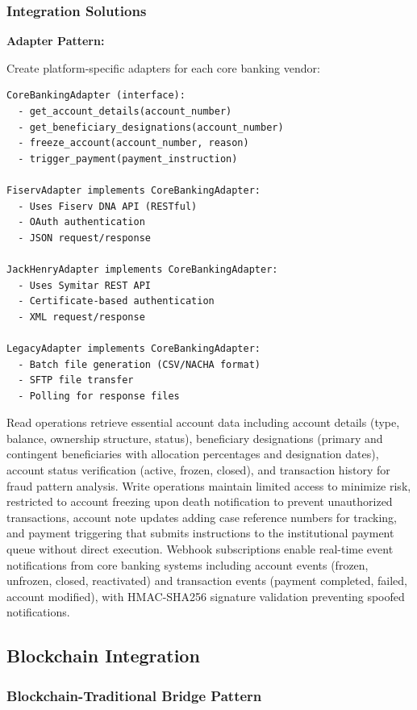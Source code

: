 \subsubsection{Integration Solutions}

\textbf{Adapter Pattern:}

Create platform-specific adapters for each core banking vendor:

\begin{verbatim}
CoreBankingAdapter (interface):
  - get_account_details(account_number)
  - get_beneficiary_designations(account_number)
  - freeze_account(account_number, reason)
  - trigger_payment(payment_instruction)

FiservAdapter implements CoreBankingAdapter:
  - Uses Fiserv DNA API (RESTful)
  - OAuth authentication
  - JSON request/response

JackHenryAdapter implements CoreBankingAdapter:
  - Uses Symitar REST API
  - Certificate-based authentication
  - XML request/response

LegacyAdapter implements CoreBankingAdapter:
  - Batch file generation (CSV/NACHA format)
  - SFTP file transfer
  - Polling for response files
\end{verbatim}

Read operations retrieve essential account data including account details (type, balance, ownership structure, status), beneficiary designations (primary and contingent beneficiaries with allocation percentages and designation dates), account status verification (active, frozen, closed), and transaction history for fraud pattern analysis. Write operations maintain limited access to minimize risk, restricted to account freezing upon death notification to prevent unauthorized transactions, account note updates adding case reference numbers for tracking, and payment triggering that submits instructions to the institutional payment queue without direct execution. Webhook subscriptions enable real-time event notifications from core banking systems including account events (frozen, unfrozen, closed, reactivated) and transaction events (payment completed, failed, account modified), with HMAC-SHA256 signature validation preventing spoofed notifications.

\subsection{Blockchain Integration}

\subsubsection{Blockchain-Traditional Bridge Pattern}

